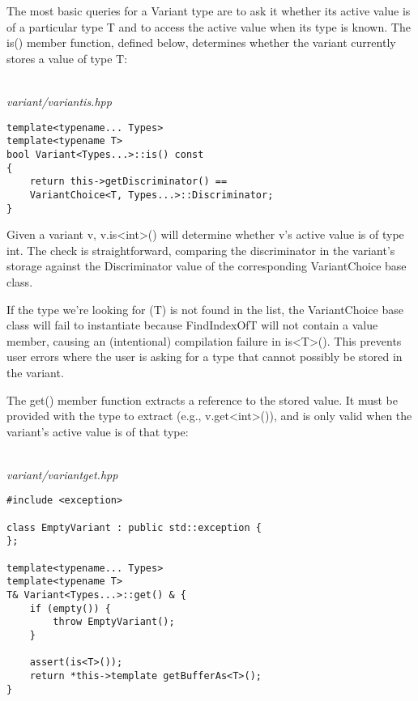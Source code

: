 The most basic queries for a Variant type are to ask it whether its active value is of a particular type T and to access the active value when its type is known. The is() member function, defined below, determines whether the variant currently stores a value of type T:

\hspace*{\fill} \\ %
\noindent
\textit{variant/variantis.hpp}
\begin{lstlisting}[style=styleCXX]
template<typename... Types>
template<typename T>
bool Variant<Types...>::is() const
{
	return this->getDiscriminator() ==
	VariantChoice<T, Types...>::Discriminator;
}
\end{lstlisting}

Given a variant v, v.is<int>() will determine whether v’s active value is of type int. The check is straightforward, comparing the discriminator in the variant’s storage against the Discriminator value of the corresponding VariantChoice base class.

If the type we’re looking for (T) is not found in the list, the VariantChoice base class will fail to instantiate because FindIndexOfT will not contain a value member, causing an (intentional) compilation failure in is<T>(). This prevents user errors where the user is asking for a type that cannot possibly be stored in the variant.

The get() member function extracts a reference to the stored value. It must be provided with the type to extract (e.g., v.get<int>()), and is only valid when the variant’s active value is of that type:

\hspace*{\fill} \\ %
\noindent
\textit{variant/variantget.hpp}
\begin{lstlisting}[style=styleCXX]
#include <exception>

class EmptyVariant : public std::exception {
};

template<typename... Types>
template<typename T>
T& Variant<Types...>::get() & {
	if (empty()) {
		throw EmptyVariant();
	}

	assert(is<T>());
	return *this->template getBufferAs<T>();
}
\end{lstlisting}

